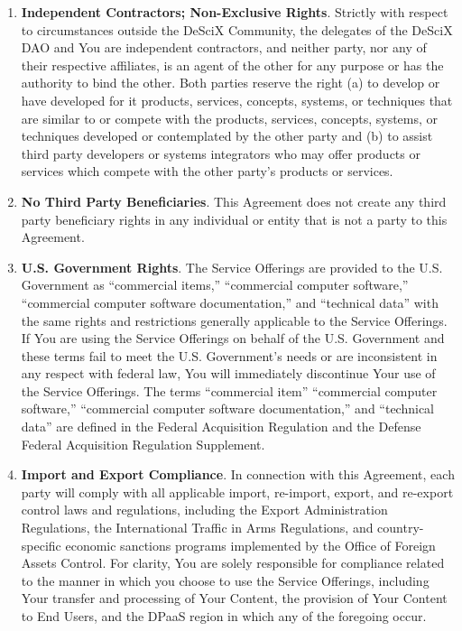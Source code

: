 \documentclass{article}
\begin{document}
\begin{enumerate}
\begin{enumerate}
        \item \textbf{Independent Contractors; Non-Exclusive Rights}. Strictly with respect to circumstances outside the DeSciX Community, the delegates of the DeSciX DAO and You are independent contractors, and neither party, nor any of their respective affiliates, is an agent of the other for any purpose or has the authority to bind the other. Both parties reserve the right (a) to develop or have developed for it products, services, concepts, systems, or techniques that are similar to or compete with the products, services, concepts, systems, or techniques developed or contemplated by the other party and (b) to assist third party developers or systems integrators who may offer products or services which compete with the other party’s products or services.
        
        \item \textbf{No Third Party Beneficiaries}. This Agreement does not create any third party beneficiary rights in any individual or entity that is not a party to this Agreement.
        
        \item \textbf{U.S. Government Rights}. The Service Offerings are provided to the U.S. Government as “commercial items,” “commercial computer software,” “commercial computer software documentation,” and “technical data” with the same rights and restrictions generally applicable to the Service Offerings. If You are using the Service Offerings on behalf of the U.S. Government and these terms fail to meet the U.S. Government’s needs or are inconsistent in any respect with federal law, You will immediately discontinue Your use of the Service Offerings. The terms “commercial item” “commercial computer software,” “commercial computer software documentation,” and “technical data” are defined in the Federal Acquisition Regulation and the Defense Federal Acquisition Regulation Supplement.
        
        \item \textbf{Import and Export Compliance}. In connection with this Agreement, each party will comply with all applicable import, re-import, export, and re-export control laws and regulations, including the Export Administration Regulations, the International Traffic in Arms Regulations, and country-specific economic sanctions programs implemented by the Office of Foreign Assets Control. For clarity, You are solely responsible for compliance related to the manner in which you choose to use the Service Offerings, including Your transfer and processing of Your Content, the provision of Your Content to End Users, and the DPaaS region in which any of the foregoing occur.
        

\end{enumerate}
\end{enumerate}
\end{document}
